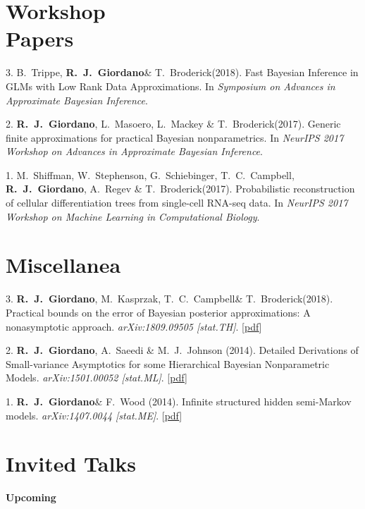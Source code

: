 \documentclass[margin,line]{res}
\newenvironment{talkgroup}{\setlength{\parskip}{3pt}\everypar{\hangafter=1\hangindent=1em\relax}\par}{\par\everypar{\hangafter=0\relax}}
\newcommand{\me}{\textbf{R.~J.~Giordano}\xspace}
\newcommand{\trevor}{T.~C.~Campbell\xspace}
\newcommand{\tamara}{T.~Broderick\xspace}
\newcommand{\paperref}[1]{[\href{#1}{pdf}]}
\newcommand{\paperref}[1]{}
\begin{document}
\begin{resume}
\section{\sc Workshop \\ Papers}

3. B.~Trippe, \me \& \tamara (2018).
Fast Bayesian Inference in GLMs with Low Rank Data Approximations.
In \emph{Symposium on Advances in Approximate Bayesian Inference}.

2. \me, L.~Masoero, L.~Mackey \& \tamara (2017).
Generic finite approximations for practical Bayesian nonparametrics.
In \emph{NeurIPS 2017 Workshop on Advances in Approximate Bayesian Inference}.

1. M.~Shiffman, W.~Stephenson, G.~Schiebinger, \trevor, \me, A.~Regev \& \tamara (2017).
Probabilistic reconstruction of cellular differentiation trees from single-cell RNA-seq data.
In \emph{NeurIPS 2017 Workshop on Machine Learning in Computational Biology}.


\section{\sc Miscellanea}

3. \me, M.~Kasprzak, \trevor \& \tamara (2018).
Practical bounds on the error of Bayesian posterior approximations: A nonasymptotic approach.
\emph{arXiv:1809.09505 [stat.TH]}.
\paperref{https://arxiv.org/abs/1809.09505}

2. \me, A.~Saeedi \& M.~J.~Johnson (2014).
Detailed Derivations of Small-variance Asymptotics for some Hierarchical Bayesian Nonparametric Models.
\emph{arXiv:1501.00052 [stat.ML]}.
\paperref{http://arxiv.org/abs/1501.00052}

1. \me \& F.~Wood (2014).
Infinite structured hidden semi-Markov models.
\emph{arXiv:1407.0044 [stat.ME]}.
\paperref{http://arxiv.org/abs/1407.0044}



\section{\sc Invited Talks}

\textbf{Upcoming} \\[-.5em]

\begin{talkgroup}


\end{talkgroup}
\end{resume}
\end{document}

